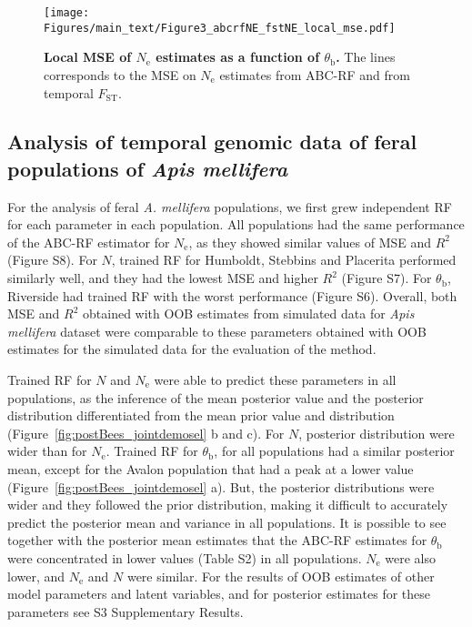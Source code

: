 \documentclass[a4paper, 12pt]{article}
\begin{document}
\begin{figure}[ht]
  \centering
  \texttt{[image: Figures/main\_text/Figure3\_abcrfNE\_fstNE\_local\_mse.pdf]}
  \small\caption{\textbf{Local MSE of $N_{\mathrm{e}}$ estimates as a function of $\theta_{\mathrm{b}}$.} The lines corresponds to the MSE on $N_{\mathrm{e}}$ estimates from ABC-RF and from temporal $F_{\mathrm{ST}}$.}
  \label{fig:local_mse_nes}
\end{figure}

\subsection*{Analysis of temporal genomic data of feral populations of \textit{Apis mellifera}}

For the analysis of feral \textit{A. mellifera} populations, we first grew independent RF for each parameter in each population. All populations had the same performance of the ABC-RF estimator for $N_{\mathrm{e}}$, as they showed similar values of MSE and $R^2$ (Figure S8). For $N$, trained RF for Humboldt, Stebbins and Placerita performed similarly well, and they had the lowest MSE and higher $R^2$ (Figure S7). For $\theta_\mathrm{b}$, Riverside had trained RF with the worst performance (Figure S6). Overall, both MSE and $R^2$ obtained with OOB estimates from simulated data for \textit{Apis mellifera} dataset were comparable to these parameters obtained with OOB estimates for the simulated data for the evaluation of the method. 

Trained RF for $N$ and $N_{\mathrm{e}}$ were able to predict these parameters in all populations, as the inference of the mean posterior value and the posterior distribution differentiated from the mean prior value and distribution (Figure~\ref{fig:postBees_jointdemosel} b and c). For $N$, posterior distribution were wider  than for $N_{\mathrm{e}}$. Trained RF for $\theta_{\mathrm{b}}$, for all populations had a similar posterior mean, except for the Avalon population that had a peak at a lower value (Figure~\ref{fig:postBees_jointdemosel} a). But, the posterior distributions were wider and they followed the prior distribution, making it difficult to accurately predict the posterior mean and variance in all populations. It is possible to see together with the posterior mean estimates that the ABC-RF estimates for $\theta_{\mathrm{b}}$ were concentrated in lower values (Table S2) in all populations. $N_{\mathrm{e}}$ were also lower, and $N_{\mathrm{e}}$ and $N$ were similar. For the results of OOB estimates of other model parameters and latent variables, and for posterior estimates for these parameters see S3 Supplementary Results.
\end{document}
